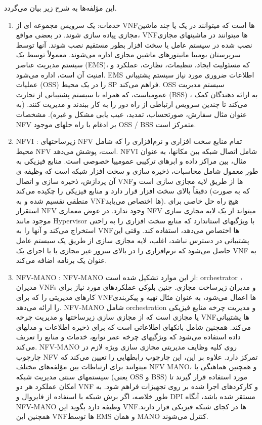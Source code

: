 این مؤلفه‌ها به شرح زیر بیان می‌گردد\cite{NFVArch}.
\begin{enumerate}
\item 
خدمات: یک سرویس مجموعه ای از VNFها است که میتوانند در یک یا چند ماشین مجازی پیاده سازی شوند.
در بعضی مواقع، VNFها میتوانند در ماشینهای مجازی نصب شده در سیستم عامل یا سخت افزار بطور مستقیم نصب شوند. آنها توسط سرپرستان بومییا مانیتورهای ماشین مجازی اداره می‌شوند.
معمولاً توسط یک سیستم مدیریت عناصر  (EMS)،
 که مسئولیت ایجاد، تنظیمات، نظارت، عملکرد و امنیت آن است، اداره می‌شود.
 EMS 
 اطلاعات ضروری مورد نیاز سیستم پشتیبانی عملیات (OSS) را در یک محیط SP فراهم می‌کند.
 OSS
  سیستم مدیریت عمومیاست، که  همراه با سیستم پشتیبانی از تجارت 
  (BSS)
 ، به ارائه دهندگان کمک می‌کند تا چندین سرویس ارتباطی از راه دور را به کار ببندند و مدیریت کنند.
  (به عنوان مثال سفارش، صورتحساب، تمدید، عیب یابی مشکل و غیره).
مشخصات NFV بر ادغام با راه حلهای موجود OSS / BSS متمرکز است.
\item NFVI
:
زیرساختهای NFV تمام منابع سخت افزاری و نرم‌افزاری را که شامل محیط NFV است، پوشش می‌دهد.
NFVI شامل اتصال شبکه بین مکانها، به عنوان مثال، بین
مراکز داده و ابرهای ترکیبی عمومییا خصوصی است.
منابع فیزیکی به طور معمول شامل محاسبات، ذخیره سازی و سخت افزار شبکه است که وظیفه ی آن پردازش، ذخیره سازی و اتصال VNFها از طریق لایه مجازی سازی است و دقیقاً بالای سخت افزار قرار دارد و منابع فیزیکی را چکیده می‌کند (که به صورت منطقی تقسیم شده و به VNFها اختصاص می‌یابد).
هیچ راه حل خاصی برای استقرار NFV وجود ندارد. در عوض معماری NFV میتواند از یک لایه مجازی سازی موجود مانند Hypervisor با ویژگیهای استاندارد که منابع سخت افزاری را به راحتی استخراج می‌کند و آنها را به VNFها اختصاص می‌دهد، استفاده کند.
وقتی این پشتیبانی در دسترس نباشد، اغلب، لایه مجازی سازی از طریق یک سیستم عامل حاصل می‌شود که نرم‌افزاری را در بالای سرور غیر مجازی یا با اجرای یک VNF به عنوان یک برنامه اضافه می‌کند.
\item NFV-MANO
:
NFV-MANO
 از این موارد تشکیل شده است:
 orchestrator
،
 مدیران VNFs و مدیران زیرساخت مجازی.
 چنین بلوکی عملکردهای مورد نیاز برای کارهای مدیریتی را که برای VNFها اعمال می‌شود، به عنوان مثال تهیه و پیکربندی را  ارائه می‌دهد. 
 NFV-MANO شامل orchestration و مدیریت چرخه منابع فیزیکی یا مجازی است که از مجازی سازی زیرساختها و مدیریت چرخه VNFها پشتیبانی می‌کند.
 همچنین شامل بانکهای اطلاعاتی است که برای ذخیره اطلاعات و مدلهای داده استفاده می‌شود که ویژگیهای چرخه عمر توابع، خدمات و منابع را تعریف می‌کند.
 NFV-MANO روی کلیه وظایف مدیریتی مجازی سازی ویژه لازم در چارچوب NFV تمرکز دارد.
 علاوه بر این، این چارچوب رابطهایی را تعیین می‌کند که میتوانند برای ارتباطات بین مؤلفه‌‌های مختلف
  NFV MANO، 
 و همچنین هماهنگی با سیستمهای سنتی مدیریت شبکه (یعنی OSS و BSS) مورد استفاده قرار گیرند تا امکان عملکرد هر دو VNF و کارکردهای اجرا شده بر روی تجهیزات فراهم شود.
 به طور خلاصه، اگر برش شبکه با استفاده از فایروال و DPI مستقر شده باشد، آنگاه NFV-MANO وظیفه دارد بگوید این VNFها در کجای شبکه فیزیکی قرار دارند. همچنین این VNFها توسط EMS و همان MANO کنترل می‌شوند.
\end{enumerate}
